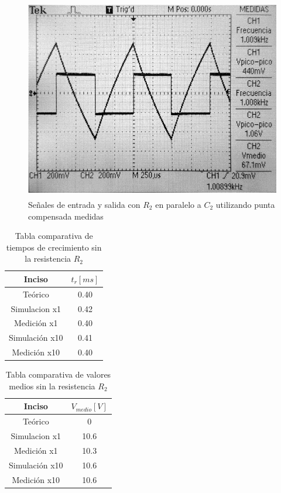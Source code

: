 \documentclass[10pt,spanish,a4paper,openany,notitlepage]{article}
\begin{document}
\begin{figure}[H]
\centering
\includegraphics[width=350pt, height=250pt]{mediciones/B-X10-CC-10K.jpg}
\caption{Señales de entrada y salida con $R_2$ en paralelo a $C_2$ utilizando punta compensada medidas}
\label{fig:int_x10_R_med}
\end{figure}



\begin{table}[H]
\centering
\begin{tabular}{|c|c|} \hline
Inciso & ${t}_{r}[\unit{ms}]$   \\ \hline
Teórico & 0.40  \\ \hline
Simulacion x1 & 0.42  \\ \hline
Medición x1 & 0.40 \\ \hline
Simulación x10 & 0.41 \\ \hline
Medición x10 & 0.40 \\ \hline
\end{tabular}
\caption{Tabla comparativa de tiempos de crecimiento sin la resistencia ${R}_{2}$}
\label{table:tabla_tcrecimiento}
\end{table}

\begin{table}[H]
\centering
\begin{tabular}{|c|c|} \hline
Inciso & ${V}_{medio}[\unit{V}]$   \\ \hline
Teórico & 0 \\ \hline
Simulacion x1 & 10.6 \\ \hline
Medición x1 & 10.3 \\ \hline
Simulación x10 & 10.6 \\ \hline
Medición x10 & 10.6 \\ \hline
\end{tabular}
\caption{Tabla comparativa de valores medios sin la resistencia ${R}_{2}$}
\label{table:tabla_vmedio}
\end{table}
\end{document}
